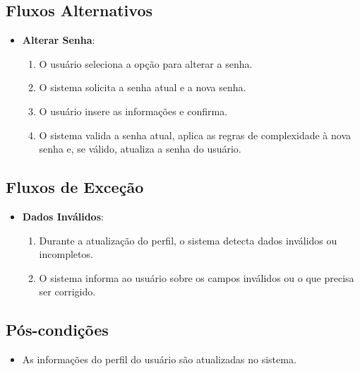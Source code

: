 \subsection*{Fluxos Alternativos}
\begin{addmargin}[1.5cm]{0cm}
    \begin{itemize}
        \item \textbf{Alterar Senha}:
        \begin{enumerate}
            \item O usuário seleciona a opção para alterar a senha.
            \item O sistema solicita a senha atual e a nova senha.
            \item O usuário insere as informações e confirma.
            \item O sistema valida a senha atual, aplica as regras de complexidade à nova senha e, se válido, atualiza a senha do usuário.
        \end{enumerate}
    \end{itemize}
\end{addmargin}

\subsection*{Fluxos de Exceção}
\begin{addmargin}[1.5cm]{0cm}
    \begin{itemize}
        \item \textbf{Dados Inválidos}:
        \begin{enumerate}
            \item Durante a atualização do perfil, o sistema detecta dados inválidos ou incompletos.
            \item O sistema informa ao usuário sobre os campos inválidos ou o que precisa ser corrigido.
        \end{enumerate}
    \end{itemize}
\end{addmargin}

\subsection*{Pós-condições}
\begin{addmargin}[1.5cm]{0cm}
    \begin{itemize}
        \item As informações do perfil do usuário são atualizadas no sistema.
    \end{itemize}
\end{addmargin}

